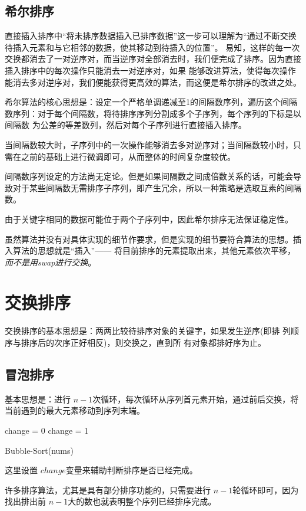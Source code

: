 \subsection{希尔排序}
直接插入排序中“将未排序数据插入已排序数据”这一步可以理解为“通过不断交换待插入元素和与它相邻的数据，使其移动到待插入的位置”。
易知，这样的每一次交换都消去了一对逆序对，而当逆序对全部消去时，我们便完成了排序。因为直接插入排序中的每次操作只能消去一对逆序对，如果
能够改进算法，使得每次操作能消去多对逆序对，我们便能获得更高效的算法，而这便是希尔排序的改进之处。

希尔算法的核心思想是：设定一个严格单调递减至1的间隔数序列，遍历这个间隔数序列：对于每个间隔数，将待排序序列分割成多个子序列，每个序列的下标是以间隔数
为公差的等差数列，然后对每个子序列进行直接插入排序。

当间隔数较大时，子序列中的一次操作能够消去多对逆序对；当间隔数较小时，只需在之前的基础上进行微调即可，从而整体的时间复杂度较优。
\begin{myrmk}
    间隔数序列设定的方法尚无定论。但是如果间隔数之间成倍数关系的话，可能会导致对于某些间隔数无需排序子序列，即产生冗余，所以一种策略是选取互素的间隔数。
\end{myrmk}
由于关键字相同的数据可能位于两个子序列中，因此希尔排序无法保证稳定性。
\begin{myrmk}
    虽然算法并没有对具体实现的细节作要求，但是实现的细节要符合算法的思想。插入算法的思想就是“插入”——
    将目前排序的元素提取出来，其他元素依次平移，\emph{而不是用swap进行交换}。
\end{myrmk}
\section{交换排序}
交换排序的基本思想是：两两比较待排序对象的关键字，如果发生逆序(即排
列顺序与排序后的次序正好相反)，则交换之，直到所
有对象都排好序为止。

\subsection{冒泡排序}
基本思想是：进行 $n-1$次循环，每次循环从序列首元素开始，通过前后交换，将当前遇到的最大元素移动到序列末端。
\begin{algorithm}
    {
        change = 0
        {
            change = 1\;
        }
    }
    \caption{Bubble-Sort(nums)}
\end{algorithm}
\begin{myrmk}
    这里设置 $change$变量来辅助判断排序是否已经完成。
\end{myrmk}
\begin{myrmk}
    许多排序算法，尤其是具有部分排序功能的，只需要进行 $n-1$轮循环即可，因为找出排出前 $n-1$大的数也就表明整个序列已经排序完成。
\end{myrmk}
